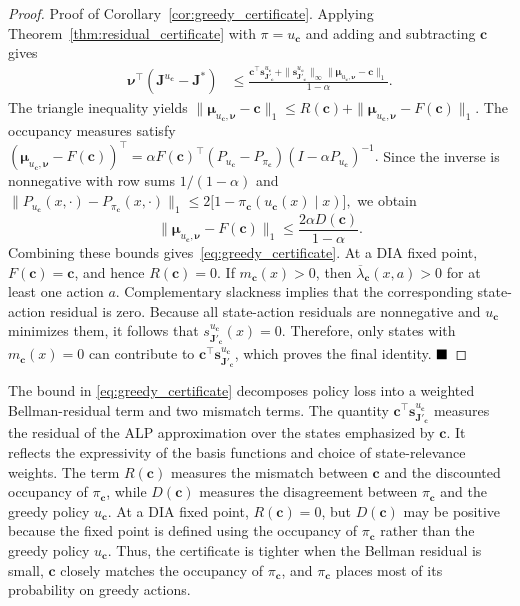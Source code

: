 \documentclass[sglanonrev]{informs4}
\providecommand{\bJ}{\boldsymbol{J}}
\providecommand{\bc}{\boldsymbol{c}}
\providecommand{\bmu}{\boldsymbol{\mu}}
\providecommand{\bnu}{\boldsymbol{\nu}}
\begin{document}
\begin{proof}{Proof of Corollary~\ref{cor:greedy_certificate}.}
Applying Theorem~\ref{thm:residual_certificate} with
$\pi=u_{\bc}$ and adding and subtracting $\bc$ gives
\[
\begin{aligned}
\bnu^\top(\bJ^{u_{\bc}}-\bJ^*)
&\le
\frac{
\bc^\top\boldsymbol s_{\bJ'_{\bc}}^{u_{\bc}}
+
\|\boldsymbol s_{\bJ'_{\bc}}^{u_{\bc}}\|_\infty
\|\bmu_{u_{\bc},\bnu}-\bc\|_1}
{1-\alpha}.
\end{aligned}
\]
The triangle inequality yields
\(
\|\bmu_{u_{\bc},\bnu}-\bc\|_1
\le
R(\bc)
+\|\bmu_{u_{\bc},\bnu}-F(\bc)\|_1.
\)
The occupancy measures satisfy
$
(\bmu_{u_{\bc},\bnu}-F(\bc))^\top
=
\alpha F(\bc)^\top
(P_{u_{\bc}}-P_{\pi_{\bc}})
(I-\alpha P_{u_{\bc}})^{-1}.
$
Since the inverse is nonnegative with row sums $1/(1-\alpha)$ and
\(
\|P_{u_{\bc}}(x,\cdot)-P_{\pi_{\bc}}(x,\cdot)\|_1
\le
2\bigl[1-\pi_{\bc}(u_{\bc}(x)\mid x)\bigr],
\)
we obtain
\[
\|\bmu_{u_{\bc},\bnu}-F(\bc)\|_1
\le\frac{2\alpha D(\bc)}{1-\alpha}.
\]
Combining these bounds gives~\eqref{eq:greedy_certificate}. At a
\ac{DIA} fixed point, $F(\bc)=\bc$, and hence $R(\bc)=0$.
If $m_{\bc}(x)>0$, then
$\overline\lambda_{\bc}(x,a)>0$ for at least one action $a$.
Complementary slackness implies that the corresponding state-action
residual is zero. Because all state-action residuals are nonnegative and
$u_{\bc}$ minimizes them, it follows that
$s_{\bJ'_{\bc}}^{u_{\bc}}(x)=0$. Therefore, only states with
$m_{\bc}(x)=0$ can contribute to
$\bc^\top\boldsymbol s_{\bJ'_{\bc}}^{u_{\bc}}$, which proves
the final identity.
$\hfill\blacksquare$
\end{proof}

\smallskip
The bound in \eqref{eq:greedy_certificate} decomposes policy loss into a
weighted Bellman-residual term and two mismatch terms. The quantity
$\bc^\top\boldsymbol s_{\bJ'_{\bc}}^{u_{\bc}}$ measures the residual of the \ac{ALP} approximation over the states emphasized by $\bc$. It reflects the expressivity of the basis functions and choice of state-relevance weights. The term $R(\bc)$ measures
the mismatch between $\bc$ and the discounted occupancy of $\pi_{\bc}$,
while $D(\bc)$ measures the disagreement between $\pi_{\bc}$ and the
greedy policy $u_{\bc}$. At a \ac{DIA} fixed point,
$R(\bc)=0$, but $D(\bc)$ may be positive because the
fixed point is defined using the occupancy of $\pi_{\bc}$ rather than
the greedy policy $u_{\bc}$. Thus, the certificate is tighter when the Bellman residual is small, $\bc$ closely matches the occupancy of $\pi_{\bc}$, and $\pi_{\bc}$ places most of its probability on greedy actions.
\end{document}

